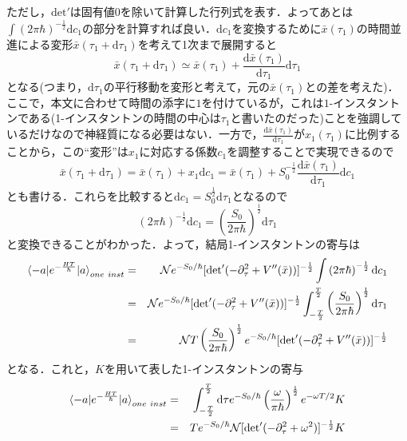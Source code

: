 \documentclass[a4paper,11pt]{jsarticle}
\begin{document}
ただし，$\mathrm{det}'$は固有値$0$を除いて計算した行列式を表す．よってあとは$\int\left(2\pi\hbar\right)^{-\frac{1}{2}}\mathrm{d}c_1$の部分を計算すれば良い．$\mathrm{d}c_1$を変換するために$\bar{x}(\tau_1)$の時間並進による変形$\bar{x}(\tau_1+\mathrm{d}\tau_1)$を考えて1次まで展開すると
\begin{equation*}
\bar{x}(\tau_1+\mathrm{d}\tau_1)\simeq \bar{x}(\tau_1)+\frac{\mathrm{d}\bar{x}(\tau_1)}{\mathrm{d}\tau_1}\mathrm{d}\tau_1
\end{equation*}
となる(つまり，$\mathrm{d}\tau_1$の平行移動を変形と考えて，元の$\bar{x}(\tau_1)$との差を考えた)．ここで，本文に合わせて時間の添字に$1$を付けているが，これは$1$-インスタントンである(1-インスタントンの時間の中心は$\tau_1$と書いたのだった)ことを強調しているだけなので神経質になる必要はない．一方で，$\frac{\mathrm{d}\bar{x}(\tau_1)}{\mathrm{d}\tau_1}$が$x_1(\tau_1)$に比例することから，この``変形''は$x_1$に対応する係数$c_1$を調整することで実現できるので
\begin{equation*}
\bar{x}(\tau_1+\mathrm{d}\tau_1)=\bar{x}(\tau_1)+x_1\mathrm{d}c_1=\bar{x}(\tau_1)+S_0^{-\frac{1}{2}}\frac{\mathrm{d}\bar{x}(\tau_1)}{\mathrm{d}\tau_1}\mathrm{d}c_1
\end{equation*}
とも書ける．これらを比較すると$\mathrm{d}c_1=S_0^{\frac{1}{2}}\mathrm{d}\tau_1$となるので
\begin{equation*}
\left(2\pi\hbar\right)^{-\frac{1}{2}}\mathrm{d}c_1=\left(\frac{S_0}{2\pi\hbar}\right)^{\frac{1}{2}}\mathrm{d}\tau_1
\end{equation*}
と変換できることがわかった．よって，結局1-インスタントンの寄与は
\begin{eqnarray*}
\braket{-a|e^{-\frac{HT}{\hbar}}|a}_{one{\ }inst}&=&\mathcal{N}e^{-S_0/\hbar}[\mathrm{det}'(-\partial_\tau^2+V''(\bar{x}))]^{-\frac{1}{2}}\int\left(2\pi\hbar\right)^{-\frac{1}{2}}\mathrm{d}c_1 \\
&=&\mathcal{N}e^{-S_0/\hbar}[\mathrm{det}'(-\partial_\tau^2+V''(\bar{x}))]^{-\frac{1}{2}}\int_{-\frac{T}{2}}^{\frac{T}{2}}\left(\frac{S_0}{2\pi\hbar}\right)^{\frac{1}{2}}\mathrm{d}\tau_1 \\
&=&\mathcal{N}T\left(\frac{S_0}{2\pi\hbar}\right)^{\frac{1}{2}}e^{-S_0/\hbar}[\mathrm{det}'(-\partial_\tau^2+V''(\bar{x}))]^{-\frac{1}{2}}
\end{eqnarray*}
となる．これと，$K$を用いて表した1-インスタントンの寄与
\begin{eqnarray*}
\braket{-a|e^{-\frac{HT}{\hbar}}|a}_{one{\ }inst}&=&\int_{-\frac{T}{2}}^{\frac{T}{2}}\mathrm{d}\tau e^{-S_0/\hbar}\left(\frac{\omega}{\pi\hbar}\right)^{\frac{1}{2}} e^{-\omega T/2}K \\
&=&Te^{-S_0/\hbar}\mathcal{N}[\mathrm{det}'(-\partial_\tau^2+\omega^2)]^{-\frac{1}{2}}K
\end{eqnarray*}
\end{document}
